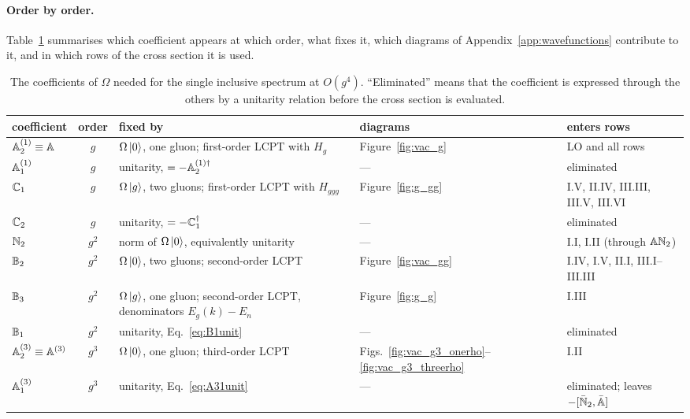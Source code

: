 \paragraph{Order by order.} Table~\ref{tab:coeffs} summarises which coefficient appears at which order, what fixes it, which diagrams of Appendix~\ref{app:wavefunctions} contribute to it, and in which rows of the cross section it is used.
\begin{table}[t]
\centering
\renewcommand{\arraystretch}{1.25}
\footnotesize\setlength{\tabcolsep}{4pt}
\begin{tabular}{@{}l c >{\raggedright\arraybackslash}p{} >{\raggedright\arraybackslash}p{} >{\raggedright\arraybackslash}p{}@{}}
\toprule
coefficient & order & fixed by & diagrams & enters rows\\
\midrule
$\mathbb{A}^{(1)}_2\equiv\mathbb{A}$ & $g$ & $\Omega\ket0$, one gluon; first-order LCPT with $H_g$ & Figure~\ref{fig:vac_g} & LO and all rows\\
$\mathbb{A}^{(1)}_1$ & $g$ & unitarity, $=-\mathbb{A}^{(1)\dagger}_2$ & --- & eliminated\\
$\mathbb{C}_1$ & $g$ & $\Omega\ket g$, two gluons; first-order LCPT with $H_{ggg}$ & Figure~\ref{fig:g_gg} & I.V, II.IV, III.III, III.V, III.VI\\
$\mathbb{C}_2$ & $g$ & unitarity, $=-\mathbb{C}_1^\dagger$ & --- & eliminated\\
$\mathbb{N}_2$ & $g^2$ & norm of $\Omega\ket0$, equivalently unitarity & --- & I.I, I.II (through $\mathbb{A}\mathbb{N}_2$)\\
$\mathbb{B}_2$ & $g^2$ & $\Omega\ket0$, two gluons; second-order LCPT & Figure~\ref{fig:vac_gg} & I.IV, I.V, II.I, III.I--III.III\\
$\mathbb{B}_3$ & $g^2$ & $\Omega\ket g$, one gluon; second-order LCPT, denominators $E_g(k)-E_n$ & Figure~\ref{fig:g_g} & I.III\\
$\mathbb{B}_1$ & $g^2$ & unitarity, Eq.~\eqref{eq:B1unit} & --- & eliminated\\
$\mathbb{A}^{(3)}_2\equiv\mathbb{A}^{(3)}$ & $g^3$ & $\Omega\ket0$, one gluon; third-order LCPT & Figs.~\ref{fig:vac_g3_onerho}--\ref{fig:vac_g3_threerho} & I.II\\
$\mathbb{A}^{(3)}_1$ & $g^3$ & unitarity, Eq.~\eqref{eq:A31unit} & --- & eliminated; leaves $-[\bar{\mathbb{N}}_2,\bar{\mathbb{A}}]$\\
\bottomrule
\end{tabular}
\caption{The coefficients of $\Omega$ needed for the single inclusive spectrum at $O(g^4)$. ``Eliminated'' means that the coefficient is expressed through the others by a unitarity relation before the cross section is evaluated.}
\label{tab:coeffs}
\end{table}

